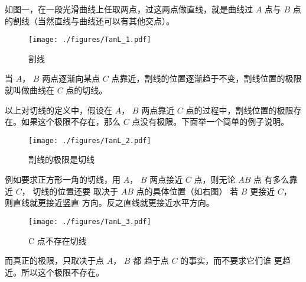 
\begin{issues}
\issueTODO
{}
\end{issues}


如图一，在一段光滑曲线上任取两点，过这两点做直线，就是曲线过 $A$ 点与 $B$ 点的割线（当然直线与曲线还可以有其他交点）。
\begin{figure}[ht]
\centering
\texttt{[image: ./figures/TanL\_1.pdf]}
\caption{割线} \label{TanL_fig1}
\end{figure}
当 $A$，  $B$ 两点逐渐向某点 $C$ 点靠近，割线的位置逐渐趋于不变，割线位置的极限就叫做曲线在 $C$ 点的切线。

以上对切线的定义中，假设在 $A$，  $B$ 两点靠近 $C$ 点的过程中，割线位置的极限存在。如果这个极限不存在，那么 $C$ 点没有极限。下面举一个简单的例子说明。

\begin{figure}[ht]
\vskip 0pt
\centering
\texttt{[image: ./figures/TanL\_2.pdf]}
\caption{割线的极限是切线} \label{TanL_fig2}
\end{figure}
例如要求正方形一角的切线，用
 $A$，  $B$ 两点接近 $C$ 点，则无论 $AB$ 点
有多么靠近 $C$， 切线的位置还要
取决于 $AB$ 点的具体位置（如右图）
若 $B$ 更接近 $C$， 则直线就更接近竖直
方向。反之直线就更接近水平方向。

\begin{figure}[ht]
\centering
\texttt{[image: ./figures/TanL\_3.pdf]}
\caption{C 点不存在切线} \label{TanL_fig3}
\end{figure}

而真正的极限，只取决于点 $A$，  $B$ 都
趋于点 $C$ 的事实，而不要求它们谁
更趋近。所以这个极限不存在。

